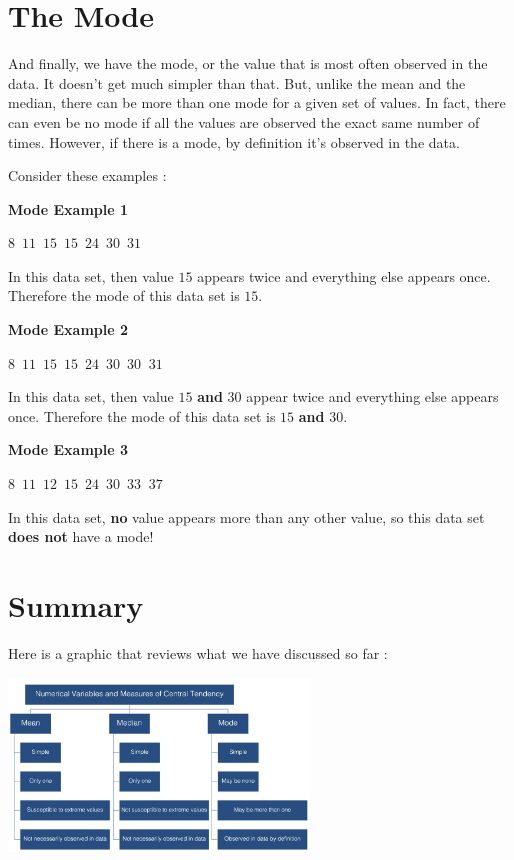 \documentclass[
  letterpaper,
  DIV=11,
  numbers=noendperiod]{scrreprt}
\begin{document}
\section*{The Mode}\label{the-mode}


And finally, we have the mode, or the value that is most often observed
in the data. It doesn't get much simpler than that. But, unlike the mean
and the median, there can be more than one mode for a given set of
values. In fact, there can even be no mode if all the values are
observed the exact same number of times. However, if there is a mode, by
definition it's observed in the data.

Consider these examples :

\textbf{Mode Example 1}

\(8\,\,\, 11\,\,\,  15\,\,\,  15\,\,\,  24\,\,\,  30\,\,\,  31\)

In this data set, then value \(15\) appears twice and everything else
appears once. Therefore the mode of this data set is \(15\).

\textbf{Mode Example 2}

\(8\,\,\, 11\,\,\,  15\,\,\,  15\,\,\,  24\,\,\,  30\,\,\,  30\,\,\ 31\)

In this data set, then value \(15\) \textbf{and} \(30\) appear twice and
everything else appears once. Therefore the mode of this data set is
\(15\) \textbf{and} \(30\).

\textbf{Mode Example 3}

\(8\,\,\, 11\,\,\,  12\,\,\,  15\,\,\,  24\,\,\,  30\,\,\,  33\,\,\ 37\)

In this data set, \textbf{no} value appears more than any other value,
so this data set \textbf{does not} have a mode!

\section*{Summary}\label{summary-1}


Here is a graphic that reviews what we have discussed so far :

\includegraphics[width=0.6\textwidth,height=\textheight]{./images/Daily-4-Pic-10.jpg}
\end{document}
